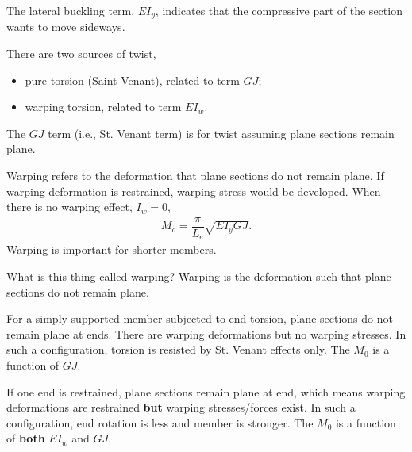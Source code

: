 The lateral buckling term, $EI_y$, indicates that the compressive part of the section wants to move sideways.

There are two sources of twist,
\begin{itemize}
\item pure torsion (Saint Venant), related to term $GJ$;
\item warping torsion, related to term $EI_w$.
\end{itemize}

The $GJ$ term (i.e., St. Venant term) is for twist assuming plane sections remain plane.
\begin{figure}[H]
\centering

\end{figure}

Warping refers to the deformation that plane sections do not remain plane. If warping deformation is restrained, warping stress would be developed. When there is no warping effect, $I_w=0$,
\begin{gather}\label{eq:no_warp}
M_o=\dfrac{\pi}{L_e}\sqrt{EI_yGJ}.
\end{gather}
Warping is important for shorter members.

What is this thing called warping? Warping is the deformation such that plane sections do not remain plane.

For a simply supported member subjected to end torsion, plane sections do not remain plane at ends. There are warping deformations but no warping stresses. In such a configuration, torsion is resisted by St. Venant effects only. The $M_0$ is a function of $GJ$.
\begin{figure}[H]
\centering\footnotesize

\end{figure}

If one end is restrained, plane sections remain plane at end, which means warping deformations are restrained \textbf{but} warping stresses/forces exist. In such a configuration, end rotation is less and member is stronger. The $M_0$ is a function of \textbf{both} $EI_w$ and $GJ$.
\begin{figure}[H]
\centering\footnotesize

\end{figure}

